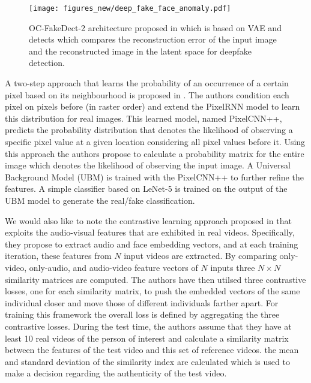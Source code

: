 \begin{figure}
    \centering
    \texttt{[image: figures\_new/deep\_fake\_face\_anomaly.pdf]}
    \caption{OC-FakeDect-2 architecture proposed in \cite{khalid2020oc}which is based on VAE and detects which compares the reconstruction error of the input image and the reconstructed image in the latent space for deepfake detection.}
    \label{fig:OC-FakeDect-2}
\end{figure}

A two-step approach that learns the probability of an occurrence of a certain pixel based on its neighbourhood is proposed in \cite{khodabakhsh2020generalizable}. The authors condition each pixel on pixels before (in raster order) and extend the PixelRNN model \cite{van2016pixel} to learn this distribution for real images. This learned model, named PixelCNN++, predicts the probability distribution that denotes the likelihood of observing a specific pixel value at a given location considering all pixel values before it. Using this approach the authors propose to calculate a probability matrix for the entire image which denotes the likelihood of observing the input image. A Universal Background Model (UBM) is trained with the PixelCNN++ to further refine the features.  A simple classifier based on LeNet-5 \cite{lecun1998gradient} is trained on the output of the UBM model to generate the real/fake classification. 

We would also like to note the contrastive learning approach proposed in \cite{cozzolino2023audio} that exploits the audio-visual features that are exhibited in real videos. Specifically, they propose to extract audio and face embedding vectors, and at each training iteration, these features from $N$ input videos are extracted. By comparing only-video, only-audio, and audio-video feature vectors of $N$ inputs three $N \times N$ similarity matrices are computed. The authors have then utilsed three contrastive losses, one for each similarity matrix, to push the embedded vectors of the same individual closer and move those of different individuals farther apart. For training this framework the overall loss is defined by aggregating the three contrastive losses. During the test time, the authors assume that they have at least 10 real videos of the person of interest and calculate a similarity matrix between the features of the test video and this set of reference videos. the mean and standard deviation of the similarity index are calculated which is used to make a decision regarding the authenticity of the test video. 

